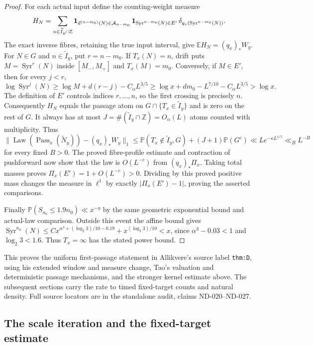 \begin{proof}
For each actual input define the counting-weight measure
\[
 H_N=\sum_{n\in\widetilde I_y\cap\mathbb Z}
 {\bf1}_{\vec a^{(n-m_0)}(N)\in\mathcal A_{n-m_0}}\,
 {\bf1}_{\operatorname{Syr}^{n-m_0}(N)\in E'}\,
 \delta_{q_x(\operatorname{Syr}^{n-m_0}(N))}.
\]
The exact inverse fibres, retaining the true input interval, give
$\mathbb EH_N=(q_x)_*W_y$.
For $N\in G$ and $n\in\widetilde I_y$, put $r=n-m_0$.
If $T_x(N)=n$, drift puts $M=\operatorname{Syr}^r(N)$ inside
$[M_-,M_+]$ and $T_x(M)=m_0$. Conversely, if $M\in E'$, then
for every $j<r$,
\[
 \log\operatorname{Syr}^j(N)
 \ge\log M+d(r-j)-C_\alpha L^{3/5}
 \ge\log x+dm_0-L^{7/10}-C_\alpha L^{3/5}>\log x.
\]
The definition of $E'$ controls indices $r,\ldots,n$, so the first
crossing is precisely $n$. Consequently $H_N$ equals the passage
atom on $G\cap\{T_x\in\widetilde I_y\}$ and is zero on the rest of $G$.
It always has at most $J=\#(\widetilde I_y\cap\mathbb Z)=O_\alpha(L)$
atoms counted with multiplicity. Thus
\[
 \|\operatorname{Law}(\operatorname{Pass}_x(\widetilde N_y))
              -(q_x)_*W_y\|_1
 \le\mathbb P(T_x\notin\widetilde I_y,G)+(J+1)\mathbb P(G^c)
 \ll L e^{-\kappa L^{1/5}}\ll_B L^{-B}
\]
for every fixed $B>0$.
The proved fibre-profile estimate and contraction of pushforward
now show that the law is $O(L^{-c})$ from $(q_x)_*\Pi_x$.
Taking total masses proves $\Pi_x(E')=1+O(L^{-c})>0$.
Dividing by this proved positive mass changes the measure in
$\ell^1$ by exactly $|\Pi_x(E')-1|$, proving the asserted comparisons.

Finally $\mathbb P(S_{n_0}\le1.9n_0)\ll x^{-\eta}$ by the same
geometric exponential bound and actual-law comparison.
Outside this event the affine bound gives
$\operatorname{Syr}^{n_0}(N)\le
C x^{\alpha^3+(\log_2 3)/10-0.19}+x^{(\log_2 3)/10}<x$,
since $\alpha^3-0.03<1$ and $\log_2 3<1.6$.
Thus $T_x=\infty$ has the stated power bound.
\end{proof}

This proves the uniform first-passage statement in Allikvere's
source label \texttt{thm:D}, using his extended window and measure
change, Tao's valuation and deterministic passage mechanisms, and
the stronger kernel estimate above. The subsequent sections carry
the rate to timed fixed-target counts and natural density.
Full source locators are in the standalone audit, claims ND-020--ND-027.

\subsection{The scale iteration and the fixed-target estimate}

